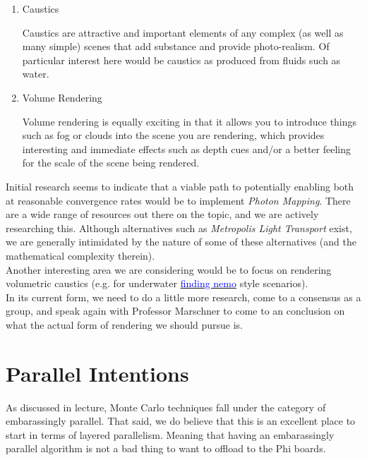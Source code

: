\documentclass[11pt]{article}
\begin{document}
\begin{enumerate}[1.]
    \item Caustics

    Caustics are attractive and important elements of any complex (as well as many simple) scenes that add substance and provide photo-realism.  Of particular interest here would be caustics as produced from fluids such as water.

    \item Volume Rendering

    Volume rendering is equally exciting in that it allows you to introduce things such as fog or clouds into the scene you are rendering, which provides interesting and immediate effects such as depth cues and/or a better feeling for the scale of the scene being rendered.
\end{enumerate}

Initial research seems to indicate that a viable path to potentially enabling both at reasonable convergence rates would be to implement \emph{Photon Mapping}.  There are a wide range of resources out there on the topic, and we are actively researching this.  Although alternatives such as \emph{Metropolis Light Transport} exist, we are generally intimidated by the nature of some of these alternatives (and the mathematical complexity therein).\\

Another interesting area we are considering would be to focus on rendering volumetric caustics (e.g. for underwater \href{http://media.theiapolis.com/d4/hU0/i1M8K/k2/l192/w1HC/finding-nemo.jpg}{\textcolor{blue}{finding nemo}} style scenarios).\\

In its current form, we need to do a little more research, come to a consensus as a group, and speak again with Professor Marschner to come to an conclusion on what the actual form of rendering we should pursue is.

\section{Parallel Intentions}

As discussed in lecture, Monte Carlo techniques fall under the category of embarassingly parallel.  That said, we do believe that this is an excellent place to start in terms of layered parallelism.  Meaning that having an embarassingly parallel algorithm is not a bad thing to want to offload to the Phi boards.\\
\end{document}
